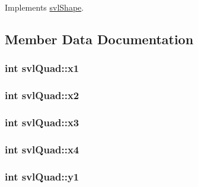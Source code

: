 Implements \hyperlink{structsvl_shape_afe5534b4382f7b5d50471dff823fdc84}{svl\+Shape}.



\subsection{Member Data Documentation}
\hypertarget{structsvl_quad_addbddfb4d8835305e7993bc95beb5396}{}
\subsubsection[{x1}]{\setlength{\rightskip}{0pt plus 5cm}int svl\+Quad\+::x1}\label{structsvl_quad_addbddfb4d8835305e7993bc95beb5396}
\hypertarget{structsvl_quad_ad76051b0fd6671b8c7d8a789a0c0bf2b}{}
\subsubsection[{x2}]{\setlength{\rightskip}{0pt plus 5cm}int svl\+Quad\+::x2}\label{structsvl_quad_ad76051b0fd6671b8c7d8a789a0c0bf2b}
\hypertarget{structsvl_quad_ab057dbdbfeafdb523773a523d8bb3ed3}{}
\subsubsection[{x3}]{\setlength{\rightskip}{0pt plus 5cm}int svl\+Quad\+::x3}\label{structsvl_quad_ab057dbdbfeafdb523773a523d8bb3ed3}
\hypertarget{structsvl_quad_aa2161465036bb13654d38e6aa4272493}{}
\subsubsection[{x4}]{\setlength{\rightskip}{0pt plus 5cm}int svl\+Quad\+::x4}\label{structsvl_quad_aa2161465036bb13654d38e6aa4272493}
\hypertarget{structsvl_quad_a27d5a63998c61d8e3d0a6a8d49b0f867}{}
\subsubsection[{y1}]{\setlength{\rightskip}{0pt plus 5cm}int svl\+Quad\+::y1}\label{structsvl_quad_a27d5a63998c61d8e3d0a6a8d49b0f867}
\hypertarget{structsvl_quad_af793c440c3bca87d594bb157fbf7a129}{}
